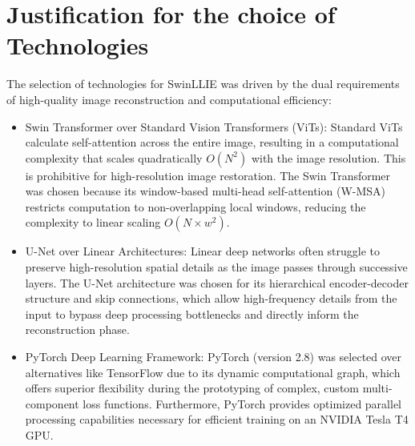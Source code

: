 \documentclass[12pt, a4paper]{report}
\begin{document}
\section{Justification for the choice of Technologies}
The selection of technologies for SwinLLIE was driven by the dual requirements of high-quality image reconstruction and computational efficiency:
\begin{itemize}
    \item Swin Transformer over Standard Vision Transformers (ViTs): Standard ViTs calculate self-attention across the entire image, resulting in a computational complexity that scales quadratically $O(N^2)$ with the image resolution. This is prohibitive for high-resolution image restoration. The Swin Transformer was chosen because its window-based multi-head self-attention (W-MSA) restricts computation to non-overlapping local windows, reducing the complexity to linear scaling $O(N \times w^2)$.
    \item U-Net over Linear Architectures: Linear deep networks often struggle to preserve high-resolution spatial details as the image passes through successive layers. The U-Net architecture was chosen for its hierarchical encoder-decoder structure and skip connections, which allow high-frequency details from the input to bypass deep processing bottlenecks and directly inform the reconstruction phase.
    \item PyTorch Deep Learning Framework: PyTorch (version 2.8) was selected over alternatives like TensorFlow due to its dynamic computational graph, which offers superior flexibility during the prototyping of complex, custom multi-component loss functions. Furthermore, PyTorch provides optimized parallel processing capabilities necessary for efficient training on an NVIDIA Tesla T4 GPU.
\end{itemize}
\end{document}
